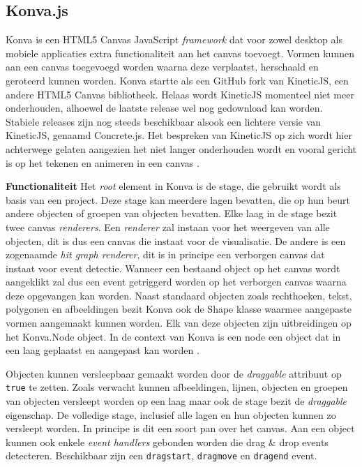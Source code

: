\subsection{Konva.js} 
Konva is een HTML5 Canvas JavaScript \textit{framework} dat voor zowel desktop als mobiele applicaties extra functionaliteit aan het canvas toevoegt. Vormen kunnen aan een canvas toegevoegd worden waarna deze verplaatst, herschaald en geroteerd kunnen worden. Konva startte als een GitHub fork van KineticJS, een andere HTML5 Canvas bibliotheek. Helaas wordt KineticJS momenteel niet meer onderhouden, alhoewel de laatste release wel nog gedownload kan worden. Stabiele releases zijn nog steeds beschikbaar alsook een lichtere versie van KineticJS, genaamd Concrete.js. Het bespreken van KineticJS op zich wordt hier achterwege gelaten aangezien het niet langer onderhouden wordt en vooral gericht is op het tekenen en animeren in een canvas \cite{KonvaGithub}.

\textbf{Functionaliteit} \break
Het \textit{root} element in Konva is de stage, die gebruikt wordt als basis van een project. Deze stage kan meerdere lagen bevatten, die op hun beurt andere objecten of groepen van objecten bevatten. Elke laag in de stage bezit twee canvas \textit{renderers}. Een \textit{renderer} zal instaan voor het weergeven van alle objecten, dit is dus een canvas die instaat voor de visualisatie. De andere is een zogenaamde \textit{hit graph renderer}, dit is in principe een verborgen canvas dat instaat voor event detectie. Wanneer een bestaand object op het canvas wordt aangeklikt zal dus een event getriggerd worden op het verborgen canvas waarna deze opgevangen kan worden. Naast standaard objecten zoals rechthoeken, tekst, polygonen en afbeeldingen bezit Konva ook de Shape klasse waarmee aangepaste vormen aangemaakt kunnen worden. Elk van deze objecten zijn uitbreidingen op het Konva.Node object. In de context van Konva is een node een object dat in een laag geplaatst en aangepast kan worden \cite{KonvaDocs}. 

Objecten kunnen versleepbaar gemaakt worden door de \textit{draggable} attribuut op \texttt{true} te zetten. Zoals verwacht kunnen afbeeldingen, lijnen, objecten en groepen van objecten versleept worden op een laag maar ook de stage bezit de \textit{draggable} eigenschap. De volledige stage, inclusief alle lagen en hun objecten kunnen zo versleept worden. In principe is dit een soort pan over het canvas. Aan een object kunnen ook enkele \textit{event handlers} gebonden worden die drag \& drop events detecteren. Beschikbaar zijn een \texttt{dragstart},  \texttt{dragmove} en \texttt{dragend} event. 

